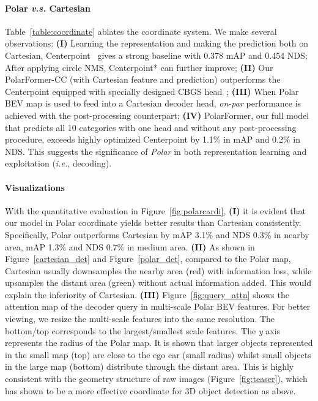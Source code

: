 \documentclass[letterpaper]{article} \usepackage{aaai23}  \usepackage{times}  \usepackage{helvet}  \usepackage{courier}  \usepackage[hyphens]{url}  \usepackage{graphicx} \urlstyle{rm} \def\UrlFont{\rm}  \usepackage{natbib}  \usepackage{caption} \frenchspacing  \setlength{\pdfpagewidth}{8.5in} \setlength{\pdfpageheight}{11in} \usepackage{algorithm}
\def\ie{\textit{i.e.}}
\begin{document}
\paragraph{Polar \textit{v.s.} Cartesian }
Table~\ref{table:coordinate} ablates the coordinate system.
We make several observations:
\textbf{(I)}
Learning the representation and making the prediction both on Cartesian, Centerpoint~\cite{yin2021center} gives a strong baseline with 0.378 mAP and 0.454 NDS;
After applying circle NMS, Centerpoint* can further improve;
\textbf{(II)}
Our PolarFormer-CC (with Cartesian feature and prediction) outperforms the Centerpoint equipped with specially designed CBGS head~\cite{yin2021center};
\textbf{(III)}
When Polar BEV map is used to feed into a Cartesian decoder head, \textit{on-par} performance is achieved with the post-processing counterpart;
\textbf{(IV)}
PolarFormer, our full model that predicts all 10 categories with one head and without any post-processing procedure, exceeds highly optimized Centerpoint by 1.1\% in mAP and 0.2\% in NDS.
This suggests the significance of \textit{Polar} 
in both representation learning and exploitation (\ie, decoding).

\paragraph{Visualizations }
With the quantitative evaluation in Figure~\ref{fig:polarcardi}, \textbf{(I)}
it is evident that our model in Polar coordinate yields better results than Cartesian consistently.
Specifically, Polar outperforms Cartesian by mAP 3.1\% and NDS 0.3\% in nearby area, mAP 1.3\% and NDS 0.7\% in medium area.
\textbf{(II)}
As shown in Figure~\ref{cartesian_det} and Figure~\ref{polar_det}, compared to the Polar map, Cartesian usually downsamples the nearby area (red) with information loss, while upsamples the distant area (green) without actual information added.
This would explain the inferiority of Cartesian.
\textbf{(III)}
Figure~\ref{fig:query_attn} shows the attention map of the decoder query in multi-scale Polar BEV features.
For better viewing, we resize the multi-scale features into the same resolution.
The bottom/top corresponds to the largest/smallest scale features.
The \textit{y} axis represents the radius of the Polar map.
It is shown that larger objects represented in the small map (top) are close to the ego car (small radius) whilst small objects in the large map (bottom) distribute through the distant area.
This is highly consistent with the geometry structure of raw images
(Figure~\ref{fig:teaser}), which has shown to be a more effective coordinate 
for 3D object detection as above.
\end{document}
